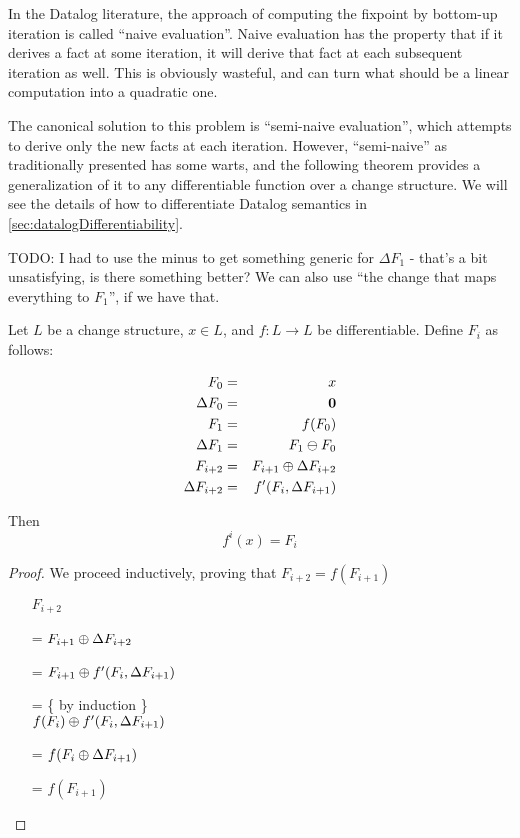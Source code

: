 In the Datalog literature, the approach of computing the fixpoint by bottom-up
iteration is called ``naive evaluation''. Naive evaluation has the property that
if it derives a fact at some iteration, it will derive that fact at each
subsequent iteration as well. This is obviously wasteful, and can turn what
should be a linear computation into a quadratic one.

The canonical solution to this problem is ``semi-naive evaluation'', which
attempts to derive only the new facts at each iteration. However, ``semi-naive''
as traditionally presented has some warts, and
the following theorem provides a generalization of it to any differentiable function over a
change structure. We will see the details of how to differentiate Datalog
semantics in \cref{sec:datalogDifferentiability}.

TODO: I had to use the minus to get something generic for $\Delta F_1$ - that's
a bit unsatisfying, is there something better? We can also use ``the change that
maps everything to $F_1$'', if we have that.

\begin{thm}
\label{thm:diffIter}
  Let $L$ be a change structure, $x \in L$, and $f: L \rightarrow L$ be differentiable. Define $F_i$ as follows:

  \begin{eqnarray*}
  F_0 & = & x\\
  \Delta F_0 & = & \textbf{0} \\
  F_1 & = & f(F_0)\\
  \Delta F_1 & = & F_1 \ominus F_0 \\
  F_{i+2} & = & F_{i+1} \oplus \Delta F_{i+2} \\
  \Delta F_{i+2} & = & f'(F_i, \Delta F_{i+1}) \\
  \end{eqnarray*}

  Then 
  $$f^i(x) = F_i$$
\end{thm}

\begin{proof}
We proceed inductively, proving that $F_{i+2} = f(F_{i+1})$

\begin{itemize}
\item[ ]$F_{i+2}$
\item[=]
$
F_{i+1} \oplus \Delta F_{i+2}
$
\item[=]
$
F_{i+1} \oplus f'( F_i, \Delta F_{i+1})
$
\item[=] \{ by induction \}\\
$
f(F_i) \oplus f'(F_i, \Delta F_{i+1})
$
\item[=]
$
f(F_i \oplus \Delta F_{i+1})
$ 
\item[=]
$f(F_{i+1})$
\end{itemize}
\end{proof}

